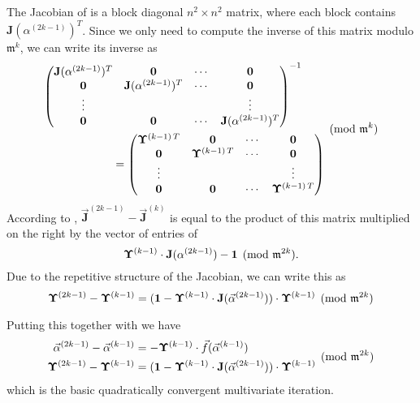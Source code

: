 {The Jacobian of  is a block diagonal
$n^{2}\times n^{2}$ matrix, where each block contains
$\mathbf{J}(\alpha^{(2k-1)})^{T}$.  Since we only need to compute the
inverse of this matrix modulo $\mathfrak{m}^{k}$, we can write its
inverse as
\[
\begin{aligned}
\begin{pmatrix}
 \mathbf{J}(\alpha^{(2k-1)})^T & {\bf 0} & \cdots & {\bf 0}\\
 {\bf 0} & \mathbf{J}(\alpha^{(2k-1)})^T & \cdots & {\bf 0} \\
 \vdots  & & & \vdots \\
 {\bf 0} & {\bf 0} & \cdots & \mathbf{J}(\alpha^{(2k-1)})^T \end{pmatrix}^{-1} \qquad\\
 = 
\begin{pmatrix}
 \mathbf{\Upsilon}^{(k-1) \, T} & {\bf 0} & \cdots & {\bf 0}\\
 {\bf 0} & \mathbf{\Upsilon}^{(k-1) \, T} & \cdots & {\bf 0} \\
 \vdots  & & & \vdots \\
 {\bf 0} & {\bf 0} & \cdots & \mathbf{\Upsilon}^{(k-1) \, T} \end{pmatrix}
\end{aligned}
\pmod{\mathfrak{m}^{k}}
\]
According to , $\vec{\mathbf{J}}^{(2k-1)} - \vec{\mathbf{J}}^{(k)}$
is equal to the product of this matrix multiplied on the right by the
vector of entries of 
\[
\mathbf{\Upsilon}^{(k-1)} \cdot \mathbf{J}(\alpha^{(2k-1)}) - {\bf 1} \pmod{\mathfrak{m}^{2k}}.
\]
Due to the repetitive structure of the Jacobian, we can write this as 
\begin{equation}
\mathbf{\Upsilon}^{(2k-1)} - \mathbf{\Upsilon}^{(k-1)} =
({\bf 1} - \mathbf{\Upsilon}^{(k-1)} \cdot \mathbf{J}(\vec{\alpha}^{(2k-1)})) \cdot 
\mathbf{\Upsilon}^{(k-1)} \pmod{\mathfrak{m}^{2k}}
\label{MNewton:3:Eq}
\end{equation}

Putting this together with  we have
\begin{equation}
\label{Quasi:MNewton:Eq}
 \begin{aligned}
   \vec{\alpha}^{(2k-1)} - \vec{\alpha}^{(k-1)} & 
      = -\mathbf{\Upsilon}^{(k-1)}\cdot \vec{f}(\vec{\alpha}^{(k-1)}) \\
   \mathbf{\Upsilon}^{(2k-1)} - \mathbf{\Upsilon}^{(k-1)} &=
     ({\bf 1} - \mathbf{\Upsilon}^{(k-1)} \cdot \mathbf{J}(\vec{\alpha}^{(2k-1)})) 
          \cdot \mathbf{\Upsilon}^{(k-1)}
 \end{aligned}
 \pmod{\mathfrak{m}^{2k}}
\end{equation}
which is the basic quadratically convergent multivariate iteration.

}
